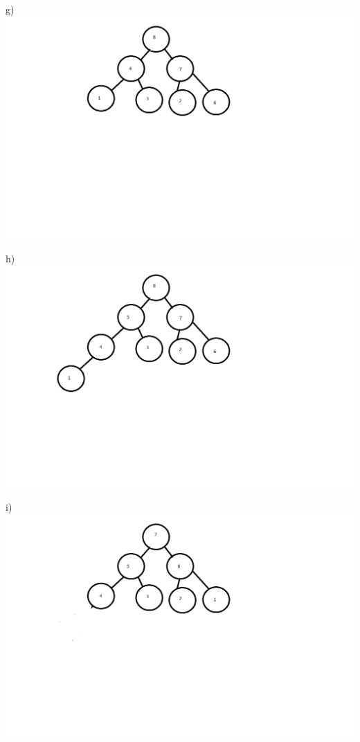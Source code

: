 \documentclass[12pt]{article} %
\begin{document}
g)\\
\includegraphics[scale = 0.5]{g.png}

h)\\
\includegraphics[scale = 0.5]{h.png}

i)\\
\includegraphics[scale = 0.5]{i.png}
\end{document}
